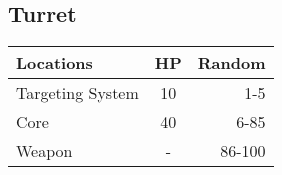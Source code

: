 \subsection{Turret}
\begin{minipage}{\textwidth/2}
	\begin{tabularx}{\textwidth}{|X|c|r|}
		\hline
		Locations        & HP & Random \\ \hline
		Targeting System & 10 &    1-5 \\ \hline
		Core             & 40 &   6-85 \\ \hline
		Weapon           & -  & 86-100 \\ \hline
	\end{tabularx}
\end{minipage}

